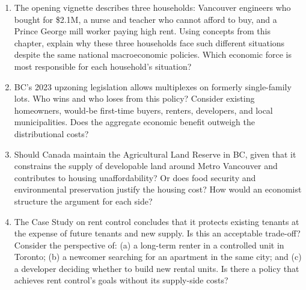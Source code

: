 \begin{enumerate}

\item The opening vignette describes three households: Vancouver engineers
who bought for \$2.1M, a nurse and teacher who cannot afford to buy, and a
Prince George mill worker paying high rent. Using concepts from this chapter,
explain why these three households face such different situations despite
the same national macroeconomic policies. Which economic force is most
responsible for each household's situation?

\item BC's 2023 upzoning legislation allows multiplexes on formerly
single-family lots. Who wins and who loses from this policy? Consider
existing homeowners, would-be first-time buyers, renters, developers,
and local municipalities. Does the aggregate economic benefit outweigh
the distributional costs?

\item Should Canada maintain the Agricultural Land Reserve in BC, given
that it constrains the supply of developable land around Metro Vancouver
and contributes to housing unaffordability? Or does food security and
environmental preservation justify the housing cost? How would an economist
structure the argument for each side?

\item The Case Study on rent control concludes that it protects existing
tenants at the expense of future tenants and new supply. Is this an
acceptable trade-off? Consider the perspective of: (a) a long-term renter
in a controlled unit in Toronto; (b) a newcomer searching for an apartment
in the same city; and (c) a developer deciding whether to build new rental
units. Is there a policy that achieves rent control's goals without its
supply-side costs?

\end{enumerate}
